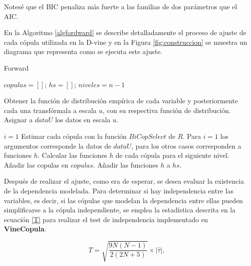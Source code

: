 Notesé que el BIC penaliza más fuerte a las familias de dos parámetros que el AIC.

En la Algoritmo \ref{algfordward} se describe detalladamente el proceso de ajuste de cada cópula utilizada en la D-vine y en la Figura \ref{fig:construccion} se muestra un diagrama que representa como se ejecuta este ajuste.

\begin{algorithm}[H]
      \caption{Forward}
      \label{algfordward}
      \begin{algorithmic}[1]  

        \State $copulas =  \left [  \right ]$; $hs =  \left [  \right ]$; $niveles = n-1$
        
        \State Obtener la función de distribución empírica de cada variable y posteriormente cada una transfórmala a escala $u$, con su respectiva función de distribución. 
        \State Asignar a $dataU$ los datos en escala $u$.
        
        \State $i = 1$
          \State Estimar cada cópula con la función $BiCopSelect$ de $R$. Para $i = 1$ los argumentos corresponde la datos de $dataU$, para los otros casos corresponden a funciones $h$.
          \State Calcular las funciones $h$ de cada cópula para el siguiente nivel.
          \State Añadir las copulas en $copulas$.
          \State Añadir las funciones $h$ a $hs$.
        \EndWhile
       
      \end{algorithmic}
    \end{algorithm}



Después de realizar el ajuste, como era de esperar, se desea evaluar la existencia de la dependencia modelada. Para determinar si hay independencia entre las variables, es decir, si las cópulas que modelan la dependencia entre ellas pueden simplificarse a la cópula independiente, se emplea la estadística descrita en la ecuación \eqref{T} para realizar el test de independencia implementado en \textbf{VineCopula}.
    
\begin{equation}\label{T}
    T = \sqrt{\frac{9N(N - 1)}{2(2N + 5)}} \times |\hat{\tau}|,
\end{equation}

